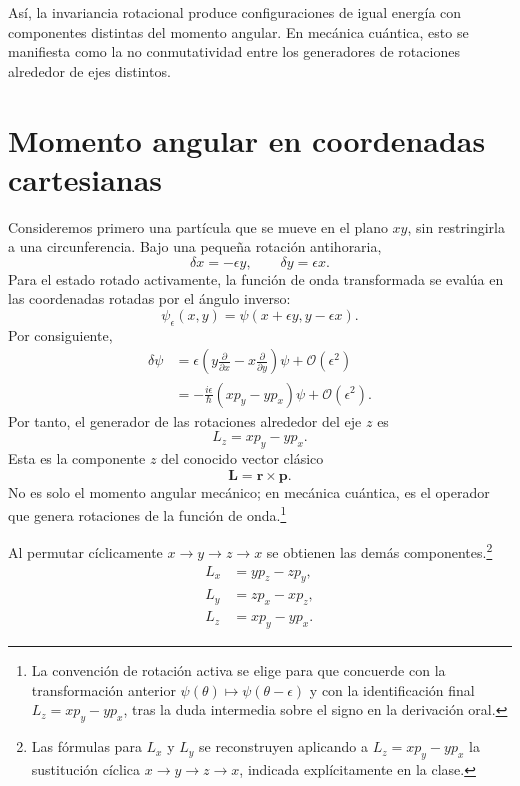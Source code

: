 Así, la invariancia rotacional produce configuraciones de igual energía con componentes distintas del momento angular. En mecánica cuántica, esto se manifiesta como la no conmutatividad entre los generadores de rotaciones alrededor de ejes distintos.

\section{Momento angular en coordenadas cartesianas}

Consideremos primero una partícula que se mueve en el plano \(xy\), sin restringirla a una circunferencia. Bajo una pequeña rotación antihoraria,
\begin{equation}
\delta x=-\epsilon y,
\qquad
\delta y=\epsilon x.
\end{equation}
Para el estado rotado activamente, la función de onda transformada se evalúa en las coordenadas rotadas por el ángulo inverso:
\begin{equation}
\psi_\epsilon(x,y)
=\psi(x+\epsilon y,y-\epsilon x).
\end{equation}
Por consiguiente,
\begin{align}
\delta\psi
&=\epsilon\left(
y\frac{\partial}{\partial x}
-x\frac{\partial}{\partial y}
\right)\psi
+\mathcal O(\epsilon^2)\\
&=-\frac{i\epsilon}{\hbar}
\left(xp_y-yp_x\right)\psi
+\mathcal O(\epsilon^2).
\end{align}
Por tanto, el generador de las rotaciones alrededor del eje \(z\) es
\begin{equation}
L_z=xp_y-yp_x.
\end{equation}
Esta es la componente \(z\) del conocido vector clásico
\begin{equation}
\mathbf L=\mathbf r\times\mathbf p.
\end{equation}
No es solo el momento angular mecánico; en mecánica cuántica, es el operador que genera rotaciones de la función de onda.\footnote{La convención de rotación activa se elige para que concuerde con la transformación anterior \(\psi(\theta)\mapsto\psi(\theta-\epsilon)\) y con la identificación final \(L_z=xp_y-yp_x\), tras la duda intermedia sobre el signo en la derivación oral.}

Al permutar cíclicamente \(x\to y\to z\to x\) se obtienen las demás componentes.\footnote{Las fórmulas para \(L_x\) y \(L_y\) se reconstruyen aplicando a \(L_z=xp_y-yp_x\) la sustitución cíclica \(x\to y\to z\to x\), indicada explícitamente en la clase.}
\begin{align}
L_x&=yp_z-zp_y,\\
L_y&=zp_x-xp_z,\\
L_z&=xp_y-yp_x.
\end{align}

